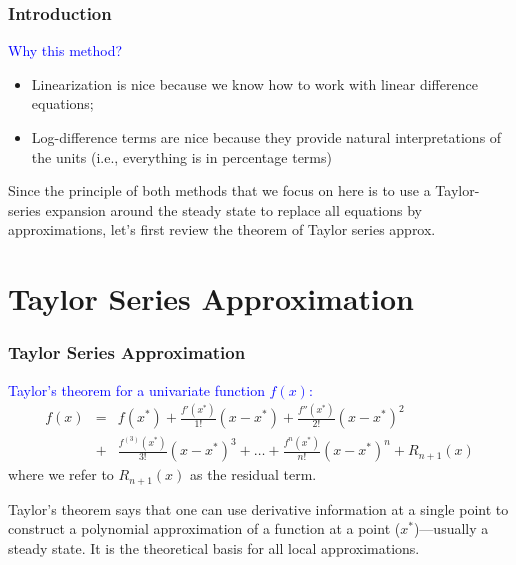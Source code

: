 \documentclass[10pt, handout]{beamer}
\begin{document}
\begin{frame}
\frametitle{Introduction} \vskip 0.1in

\textcolor{blue}{Why this method?} \vskip0.1in

\begin{itemize}
\item Linearization is nice because we know how to work with linear difference equations;
\item Log-difference terms are nice because they provide natural interpretations of the units (i.e., everything is in percentage terms)
\end{itemize}

\vskip0.2in

{\footnotesize{Since the principle of both methods that we focus on here is to use
a Taylor-series expansion around the steady state to replace all
equations by approximations, let's first review the theorem of
Taylor series approx.}}

\end{frame}

\section{Taylor Series Approximation}

\begin{frame}

\frametitle{Taylor Series Approximation}


\textcolor{blue}{Taylor's theorem for a univariate function $f(x)$:}
\begin{eqnarray}
f(x) &=& f(x^*) + \frac{f'(x^*)}{1!}(x-x^*)+ \frac{f''(x^*)}{2!}(x-x^*)^2  \nonumber\\ &+& \frac{f^{(3)}(x^*)}{3!}(x-x^*)^3 +  \ldots  + \frac{f^{n}(x^*)}{n!}(x-x^*)^n +
R_{n+1}(x)\label{EqB.1}%
\end{eqnarray}
{\footnotesize{where we refer to $R_{n+1}(x)$ as the residual term.}}\vskip 0.2in

{\footnotesize{Taylor's theorem says that one can use derivative information at a
single point to construct a polynomial approximation of a function
at a point ($x^*$)---usually a steady state. It is the theoretical basis for all local
approximations.}}

\end{frame}

\end{document}
